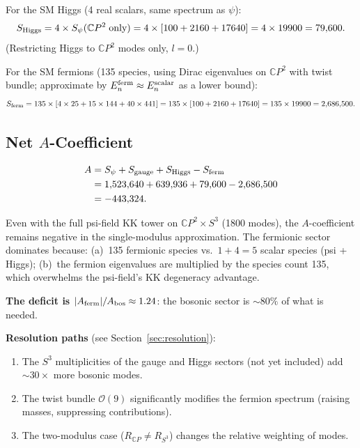 \documentclass[11pt,a4paper]{article}
\newcommand{\CP}{\mathbb{C}P}
\newcounter{findingctr}
\newenvironment{finding}[1][]{%
  \refstepcounter{findingctr}%
  \begin{tcolorbox}[colback=blue!3!white, colframe=blue!50!black,
    title=\textbf{Finding \thefindingctr: #1}]
}{%
  \end{tcolorbox}%
}
\begin{document}
For the SM Higgs (4 real scalars, same spectrum as $\psi$):
\begin{equation}
S_{\rm Higgs} = 4 \times S_{\psi}(\CP^2\;\text{only})
= 4 \times [100 + 2160 + 17640] = 4 \times 19900 = 79{,}600.
\end{equation}
(Restricting Higgs to $\CP^2$ modes only, $l = 0$.)

For the SM fermions (135 species, using Dirac eigenvalues on $\CP^2$
with twist bundle; approximate by $E_n^{\rm ferm} \approx E_n^{\rm scalar}$
as a lower bound):
\begin{equation}
S_{\rm ferm} = 135 \times [4 \times 25 + 15 \times 144 + 40 \times 441]
= 135 \times [100 + 2160 + 17640] = 135 \times 19900 = 2{,}686{,}500.
\end{equation}

\subsection{Net $A$-Coefficient}

\begin{align}
A &= S_{\psi} + S_{\rm gauge} + S_{\rm Higgs} - S_{\rm ferm} \\
  &= 1{,}523{,}640 + 639{,}936 + 79{,}600 - 2{,}686{,}500 \\
  &= -443{,}324.
\label{eq:A-net}
\end{align}

\begin{finding}[Single Psi-Field Is Insufficient for $A > 0$
  in Single-Modulus Case]
\label{find:A-negative}
Even with the full psi-field KK tower on $\CP^2 \times S^3$
(1800 modes), the $A$-coefficient remains negative in the
single-modulus approximation. The fermionic sector dominates
because: (a)~135 fermionic species vs.\ $1 + 4 = 5$ scalar
species (psi + Higgs); (b)~the fermion eigenvalues are multiplied
by the species count 135, which overwhelms the psi-field's
KK degeneracy advantage.

\textbf{The deficit is $|A_{\rm ferm}|/A_{\rm bos} \approx 1.24$}:
the bosonic sector is $\sim 80\%$ of what is needed.

\textbf{Resolution paths} (see Section~\ref{sec:resolution}):
\begin{enumerate}[nosep]
\item The $S^3$ multiplicities of the gauge and Higgs sectors
  (not yet included) add $\sim 30\times$ more bosonic modes.
\item The twist bundle $\mathcal{O}(9)$ significantly modifies
  the fermion spectrum (raising masses, suppressing contributions).
\item The two-modulus case ($R_{\CP} \neq R_{S^3}$) changes the
  relative weighting of modes.
\end{enumerate}
\end{finding}
\end{document}
